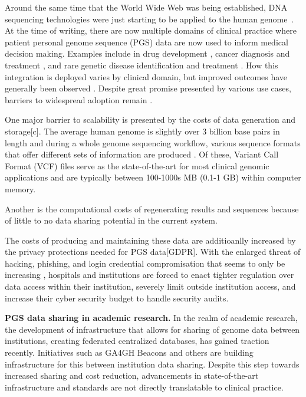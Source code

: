 \documentclass[a4paper,11pt]{article}
\begin{document}
\begin{refsection}
Around the same time that the World Wide Web was being established, DNA sequencing technologies were just starting to be applied to the human genome~\cite{hood_1987}.
At the time of writing, there are now multiple domains of clinical practice where patient personal genome sequence (PGS) data are now used to inform medical decision making. 
Examples include in drug development \cite{ko_new_2022}, cancer diagnosis and treatment \cite{mcleod_cancer_2013}, and rare genetic disease identification and treatment \cite{souche_recommendations_2022}.
How this integration is deployed varies by clinical domain, but improved outcomes have generally been observed \cite{mathur_personalized_2017}.
Despite great promise presented by various use cases, barriers to widespread adoption remain \cite{stefanicka-wojtas_barriers_2023}.

One major barrier to scalability is presented by the costs of data generation and storage[c]. %
The average human genome is slightly over 3 billion base pairs in length and during a whole genome sequencing workflow, various sequence formats that offer different sets of information are produced \cite{bagger_whole_2024}.
Of these, Variant Call Format (VCF) files \cite{danecek_variant_2011} serve as the state-of-the-art for most clinical genomic applications and are typically between 100-1000s MB (0.1-1 GB) within computer memory. 

Another is the computational costs of regenerating results and sequences because of little to no data sharing potential in the current system.

The costs of producing and maintaining these data are additioanlly increased by the privacy protections needed for PGS data[GDPR].
With the enlarged threat of hacking, phishing, and login credential compromisation that seems to only be increasing \cite{noauthor_ransomware_nodate}, hospitals and institutions are forced to enact tighter regulation over data access within their institution, severely limit outside institution access, and increase their cyber security budget to handle security audits.

\textbf{PGS data sharing in academic research.}
In the realm of academic research, the development of infrastructure that allows for sharing of genome data between institutions, creating federated centralized databases, has gained traction recently. 
Initiatives such as GA4GH Beacons \cite{rambla_beacon_2022} and others are building infrastructure for this between institution data sharing. 
Despite this step towards increased sharing and cost reduction, advancements in state-of-the-art infrastructure and standards are not directly translatable to clinical practice. 



\end{refsection}
\end{document}
